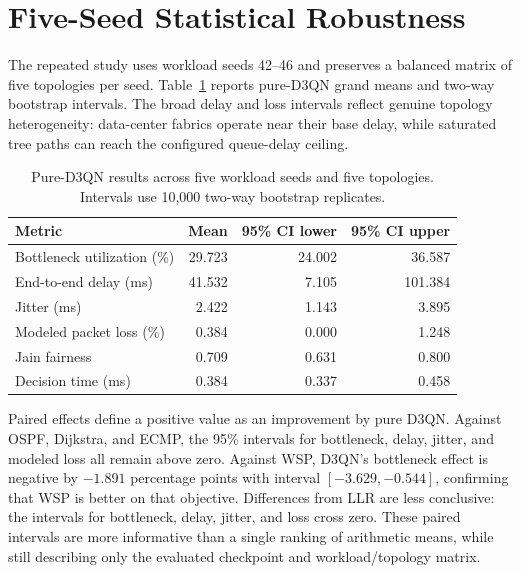 \documentclass[12pt,a4paper,oneside]{report}
\begin{document}
\section{Five-Seed Statistical Robustness}
\label{sec:fiveseed}
The repeated study uses workload seeds 42--46 and preserves a balanced matrix of five topologies per seed. Table~\ref{tab:multiseed-dqn} reports pure-D3QN grand means and two-way bootstrap intervals. The broad delay and loss intervals reflect genuine topology heterogeneity: data-center fabrics operate near their base delay, while saturated tree paths can reach the configured queue-delay ceiling.

\begin{table}[htbp]
\centering
\caption{Pure-D3QN results across five workload seeds and five topologies. Intervals use 10,000 two-way bootstrap replicates.}
\label{tab:multiseed-dqn}
\begin{tabular}{lrrr}
\toprule
\textbf{Metric} & \textbf{Mean} & \textbf{95\% CI lower} & \textbf{95\% CI upper}\\
\midrule
Bottleneck utilization (\%) & 29.723 & 24.002 & 36.587\\
End-to-end delay (ms) & 41.532 & 7.105 & 101.384\\
Jitter (ms) & 2.422 & 1.143 & 3.895\\
Modeled packet loss (\%) & 0.384 & 0.000 & 1.248\\
Jain fairness & 0.709 & 0.631 & 0.800\\
Decision time (ms) & 0.384 & 0.337 & 0.458\\
\bottomrule
\end{tabular}
\end{table}

Paired effects define a positive value as an improvement by pure D3QN. Against OSPF, Dijkstra, and ECMP, the 95\% intervals for bottleneck, delay, jitter, and modeled loss all remain above zero. Against WSP, D3QN's bottleneck effect is negative by $-1.891$ percentage points with interval $[-3.629,-0.544]$, confirming that WSP is better on that objective. Differences from LLR are less conclusive: the intervals for bottleneck, delay, jitter, and loss cross zero. These paired intervals are more informative than a single ranking of arithmetic means, while still describing only the evaluated checkpoint and workload/topology matrix.
\end{document}

